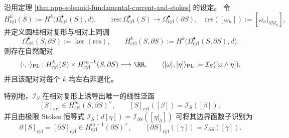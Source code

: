 \begin{theorem}\label{thm:app-solenoid-cylindrical-pl-duality}
沿用定理 \ref{thm:app-solenoid-fundamental-current-and-stokes} 的设定。
令
\[
H^k_{\mathrm{cyl}}(S):=H^k\!\bigl(\Omega^\bullet_{\mathrm{cyl}}(S),d\bigr),
\qquad
\mathrm{res}:\Omega^\bullet_{\mathrm{cyl}}(S)\to \Omega^\bullet_{\mathrm{cyl}}(\partial S),\quad
\mathrm{res}([\omega_n]):=[\omega_n|_{\partial M_n}],
\]
并定义圆柱相对复形与相对上同调
\[
\Omega^\bullet_{\mathrm{cyl}}(S,\partial S):=\ker(\mathrm{res}),
\qquad
H^k_{\mathrm{cyl}}(S,\partial S):=H^k\!\bigl(\Omega^\bullet_{\mathrm{cyl}}(S,\partial S),d\bigr).
\]
则存在自然配对
\[
\langle\cdot,\cdot\rangle_{\mathrm{PL}}:
H^k_{\mathrm{cyl}}(S)\times H^{m-k}_{\mathrm{cyl}}(S,\partial S)\longrightarrow \RR,
\qquad
\langle[\omega],[\eta]\rangle_{\mathrm{PL}}:=\mathcal I_S([\omega\wedge\eta]),
\]
并且该配对对每个 \(k\) 均左右非退化。
\par
特别地，\(\mathcal I_S\) 在相对复形上诱导出唯一的线性泛函
\[
[S]_{\mathrm{cyl}}\in H^m_{\mathrm{cyl}}(S,\partial S)^\vee,
\qquad
[S]_{\mathrm{cyl}}([\beta])=\mathcal I_S([\beta]),
\]
并且由极限 Stokes 恒等式 \(\mathcal I_S(d[\eta])=\mathcal I_{\partial S}([\eta|_{\partial}])\) 可将其边界函数子识别为
\[
\partial[S]_{\mathrm{cyl}}=[\partial S]_{\mathrm{cyl}}\in H^{m-1}_{\mathrm{cyl}}(\partial S)^\vee,
\qquad
[\partial S]_{\mathrm{cyl}}([\gamma])=\mathcal I_{\partial S}([\gamma]).
\]
\end{theorem}

